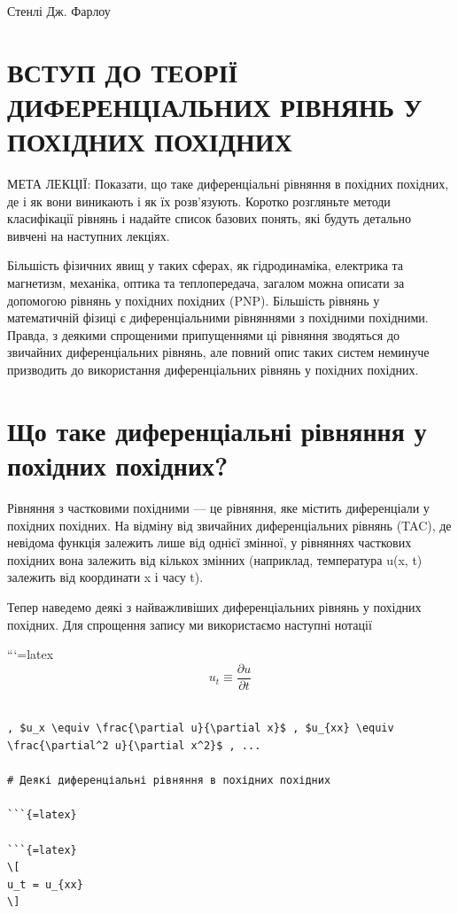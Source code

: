 \documentclass[
]{article}
\begin{document}
Стенлі Дж. Фарлоу

\section{ВСТУП ДО ТЕОРІЇ ДИФЕРЕНЦІАЛЬНИХ РІВНЯНЬ У ПОХІДНИХ
ПОХІДНИХ}\label{ux432ux441ux442ux443ux43f-ux434ux43e-ux442ux435ux43eux440ux456ux457-ux434ux438ux444ux435ux440ux435ux43dux446ux456ux430ux43bux44cux43dux438ux445-ux440ux456ux432ux43dux44fux43dux44c-ux443-ux43fux43eux445ux456ux434ux43dux438ux445-ux43fux43eux445ux456ux434ux43dux438ux445}

МЕТА ЛЕКЦІЇ: Показати, що таке диференціальні рівняння в похідних
похідних, де і як вони виникають і як їх розв'язують. Коротко розгляньте
методи класифікації рівнянь і надайте список базових понять, які будуть
детально вивчені на наступних лекціях.

Більшість фізичних явищ у таких сферах, як гідродинаміка, електрика та
магнетизм, механіка, оптика та теплопередача, загалом можна описати за
допомогою рівнянь у похідних похідних (PNP). Більшість рівнянь у
математичній фізиці є диференціальними рівняннями з похідними похідними.
Правда, з деякими спрощеними припущеннями ці рівняння зводяться до
звичайних диференціальних рівнянь, але повний опис таких систем неминуче
призводить до використання диференціальних рівнянь у похідних похідних.

\section{Що таке диференціальні рівняння у похідних
похідних?}\label{ux449ux43e-ux442ux430ux43aux435-ux434ux438ux444ux435ux440ux435ux43dux446ux456ux430ux43bux44cux43dux456-ux440ux456ux432ux43dux44fux43dux43dux44f-ux443-ux43fux43eux445ux456ux434ux43dux438ux445-ux43fux43eux445ux456ux434ux43dux438ux445}

Рівняння з частковими похідними --- це рівняння, яке містить
диференціали у похідних похідних. На відміну від звичайних
диференціальних рівнянь (TAC), де невідома функція залежить лише від
однієї змінної, у рівняннях часткових похідних вона залежить від кількох
змінних (наприклад, температура u(x, t) залежить від координати x і часу
t).

Тепер наведемо деякі з найважливіших диференціальних рівнянь у похідних
похідних. Для спрощення запису ми використаємо наступні нотації

```{=latex}
\[
u_t \equiv \frac{\partial u}{\partial t}
\]

\begin{verbatim}

, $u_x \equiv \frac{\partial u}{\partial x}$ , $u_{xx} \equiv \frac{\partial^2 u}{\partial x^2}$ , ...

# Деякі диференціальні рівняння в похідних похідних

```{=latex}

```{=latex}
\[
u_t = u_{xx}
\]
\end{verbatim}
\end{document}
